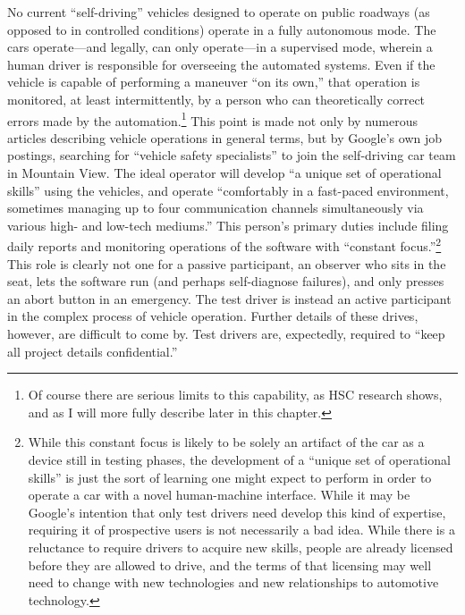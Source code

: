 No current ``self-driving'' vehicles designed to operate on public
roadways (as opposed to in controlled conditions) operate in a fully
autonomous mode. The cars operate---and legally, can only
operate\cite{???}---in
a supervised mode, wherein a human driver is responsible for
overseeing the automated systems. Even if the vehicle is capable of
performing a maneuver ``on its own,'' that operation is monitored, at
least intermittently, by a person who can theoretically correct errors
made by the automation.\footnote{Of course there are serious
  limits to this capability, as HSC research shows, and as I will
  more fully describe later in this chapter.} This point is made not
only by numerous articles describing vehicle operations in general terms,
but by Google's
own job postings, searching for ``vehicle safety specialists'' to join
the self-driving car team in Mountain View. The ideal operator will
develop ``a unique set of operational skills'' using the vehicles, and
operate ``comfortably in a fast-paced environment, sometimes managing
up to four communication channels simultaneously via various high- and
low-tech mediums.''\cite{???-googleJobPosting} This person's primary
duties include filing daily reports and monitoring operations of the
software with ``constant focus.''\footnote{While this constant focus
  is likely to be solely an artifact of the car as a device still in
  testing phases, the development of a ``unique set of operational
  skills'' is just the sort of learning one might expect to perform in
order to operate a car with a novel human-machine interface. While it
may be Google's intention that only test drivers need develop this
kind of expertise, requiring it of prospective users is not
necessarily a bad idea. While there is a reluctance to require drivers
to acquire new skills, people are already licensed before they are
allowed to drive, and the terms of that licensing may well need to
change with new technologies and new relationships to automotive
technology.} This role is clearly not one for a passive participant,
an observer who sits in the seat, lets the software run (and perhaps
self-diagnose failures), and only presses an abort button in an
emergency. The test driver is instead an active participant in the
complex process of 
vehicle operation. Further details of these drives, however,
are difficult to come by. Test drivers are, expectedly, required to
``keep all project details confidential.''\cite{???-googleJobPosting}


